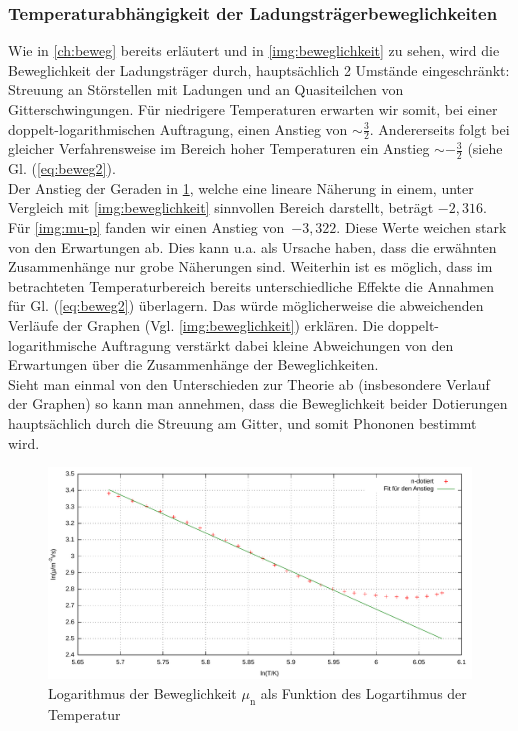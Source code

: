 \documentclass[numbers=noenddot,14pt,a4paper]{scrartcl}
\newcommand{\ix}[1]{_\text{#1}}
\begin{document}
\subsubsection{Temperaturabhängigkeit der Ladungsträgerbeweglichkeiten}
Wie in \ref{ch:beweg} bereits erläutert und in \ref{img:beweglichkeit} zu sehen, wird die Beweglichkeit der Ladungsträger durch, hauptsächlich 2 Umstände eingeschränkt: Streuung an Störstellen mit Ladungen und an Quasiteilchen von Gitterschwingungen. Für niedrigere Temperaturen erwarten wir somit, bei einer doppelt-logarithmischen Auftragung, einen Anstieg von $\sim\frac{3}{2}$. Andererseits folgt bei gleicher Verfahrensweise im Bereich hoher Temperaturen ein Anstieg $\sim-\frac{3}{2}$ (siehe Gl. (\ref{eq:beweg2}).\\
Der Anstieg der Geraden in \ref{img:mu-n}, welche eine lineare Näherung in einem, unter Vergleich mit \ref{img:beweglichkeit} sinnvollen Bereich darstellt, beträgt $-2,316$. Für \ref{img:mu-p} fanden wir einen Anstieg \mbox{von $-3,322$.} Diese Werte weichen stark von den Erwartungen ab. Dies kann u.a. als Ursache haben, dass die erwähnten Zusammenhänge nur grobe Näherungen sind. Weiterhin ist es möglich, dass im betrachteten Temperaturbereich bereits unterschiedliche Effekte die Annahmen für Gl. (\ref{eq:beweg2}) überlagern. Das würde möglicherweise die abweichenden Verläufe der Graphen (Vgl. \ref{img:beweglichkeit}) erklären. Die doppelt-logarithmische Auftragung verstärkt dabei kleine Abweichungen von den Erwartungen über die Zusammenhänge der Beweglichkeiten.\\
Sieht man einmal von den Unterschieden zur Theorie ab (insbesondere Verlauf der Graphen) so kann man annehmen, dass die Beweglichkeit beider Dotierungen hauptsächlich durch die Streuung am Gitter, und somit Phononen bestimmt wird.
\begin{figure}[H]
	\includegraphics[width=\textwidth]{messwerte/beweglichkeitn.pdf}
	\caption{Logarithmus der Beweglichkeit $\mu\ix{n}$ als Funktion des Logartihmus der Temperatur} \label{img:mu-n}
\end{figure}
\end{document}

